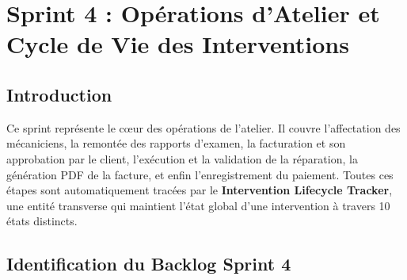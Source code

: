 \documentclass[12pt,a4paper]{report}
\begin{document}
\chapter{Sprint 4 : Opérations d'Atelier et Cycle de Vie des Interventions}

\section{Introduction}

Ce sprint représente le c\oe ur des opérations de l'atelier. Il couvre l'affectation
des mécaniciens, la remontée des rapports d'examen, la facturation et son approbation
par le client, l'exécution et la validation de la réparation, la génération PDF de la
facture, et enfin l'enregistrement du paiement. Toutes ces étapes sont automatiquement
tracées par le \textbf{Intervention Lifecycle Tracker}, une entité transverse qui
maintient l'état global d'une intervention à travers 10 états distincts.

\section{Identification du Backlog Sprint 4}
\end{document}
